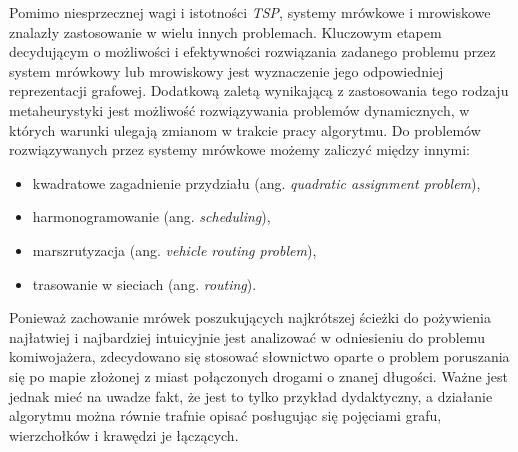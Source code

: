 {    Pomimo niesprzecznej wagi i istotności \textit{TSP}, systemy mrówkowe i mrowiskowe znalazły zastosowanie w wielu
    innych problemach. Kluczowym etapem decydującym o możliwości i efektywności rozwiązania zadanego problemu przez
    system mrówkowy lub mrowiskowy jest wyznaczenie jego odpowiedniej reprezentacji grafowej\cite{Dorigo1991AntSA}.
    Dodatkową zaletą wynikającą z zastosowania tego rodzaju metaheurystyki jest możliwość rozwiązywania problemów
    dynamicznych, w których warunki ulegają zmianom w trakcie pracy algorytmu. Do problemów rozwiązywanych przez systemy
    mrówkowe możemy zaliczyć między innymi:

    \begin{itemize}
        \item kwadratowe zagadnienie przydziału (ang. \textit{quadratic assignment problem})\cite{Maniezzo1999TheAS, Gambardella1999AntCF},
        \item harmonogramowanie (ang. \textit{scheduling})\cite{JSSchedulingColoroni94, Merkle2002AntCO},
        \item marszrutyzacja (ang. \textit{vehicle routing problem})\cite{Bullnheimer1999ApplyingTA},
        \item trasowanie w sieciach (ang. \textit{routing})\cite{Caro1999AntNetAM, Bonabeau1998RoutingIT}.
    \end{itemize}


    Ponieważ zachowanie mrówek poszukujących najkrótszej ścieżki do pożywienia najłatwiej i najbardziej intuicyjnie jest
    analizować w odniesieniu do problemu komiwojażera, zdecydowano się stosować słownictwo oparte o problem poruszania
    się po mapie złożonej z miast połączonych drogami o znanej długości. Ważne jest jednak mieć na uwadze fakt, że
    jest to tylko przykład dydaktyczny, a działanie algorytmu można równie trafnie opisać posługując się pojęciami
    grafu, wierzchołków i krawędzi je łączących.

}
